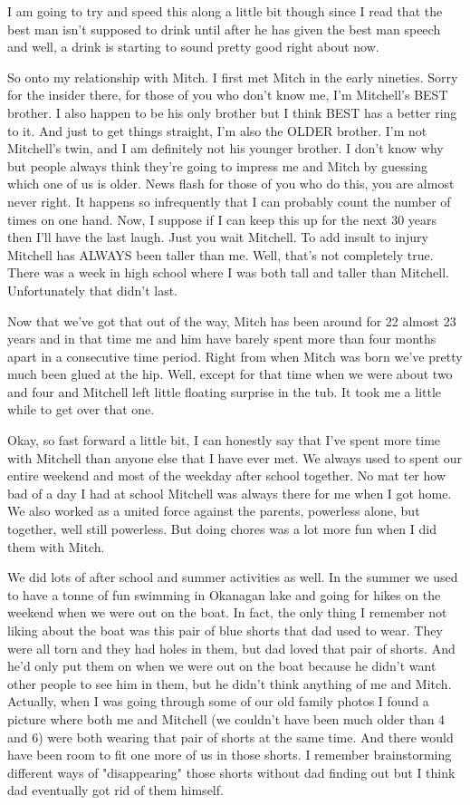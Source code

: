 I am going to try and speed this along a little bit though since I read that the best man isn't supposed to drink until after he has given the best man speech and well, a drink is starting to sound pretty good right about now.

So onto my relationship with Mitch. I first met Mitch in the early nineties. Sorry for the insider there, for those of you who don't know me, I’m Mitchell’s BEST brother. I also happen to be his only brother but I think BEST has a better ring to it. And just to get things straight, I'm also the OLDER brother. I’m not Mitchell’s twin, and I am definitely not his younger brother. I don't know why but people always think they're going to impress me and Mitch by guessing which one of us is older. News flash for those of you who do this, you are almost never right. It happens so infrequently that I can probably count the number of times on one hand. Now, I suppose if I can keep this up for the next 30 years then I'll have the last laugh. Just you wait Mitchell. To add insult to injury Mitchell has ALWAYS been taller than me. Well, that's not completely true. There was a week in high school where I was both tall and taller than Mitchell. Unfortunately that didn't last.

Now that we've got that out of the way, Mitch has been around for 22 almost 23 years and in that time me and him have barely spent more than four months apart in a consecutive time period.
Right from when Mitch was born we've pretty much been glued at the hip. Well, except for that time when we were about two and four and Mitchell left little floating surprise in the tub. It took me a little while to get over that one.

Okay, so fast forward a little bit, I can honestly say that I've spent more time with Mitchell than anyone else that I have ever met. We always used to spent our entire weekend and most of the weekday after school together. No mat
ter how bad of a day I had at school Mitchell was always there for me when I got home. We also worked as a united force against the parents, powerless alone, but together, well still powerless. But doing chores was a lot more fun when I did them with Mitch.

We did lots of after school and summer activities as well. In the summer we used to have a tonne of fun swimming in Okanagan lake and going for hikes on the weekend when we were out on the boat. In fact, the only thing I remember not liking about the boat was this pair of blue shorts that dad used to wear. They were all torn and they had holes in them, but dad loved that pair of shorts. And he'd only put them on when we were out on the boat because he didn't want other people to see him in them, but he didn't think anything of me and Mitch. Actually, when I was going through some of our old family photos I found a picture where both me and Mitchell (we couldn't have been much older than 4 and 6) were both wearing that pair of shorts at the same time. And there would have been room to fit one more of us in those shorts. I remember brainstorming different ways of "disappearing" those shorts without dad finding out but I think dad eventually got rid of them himself.

